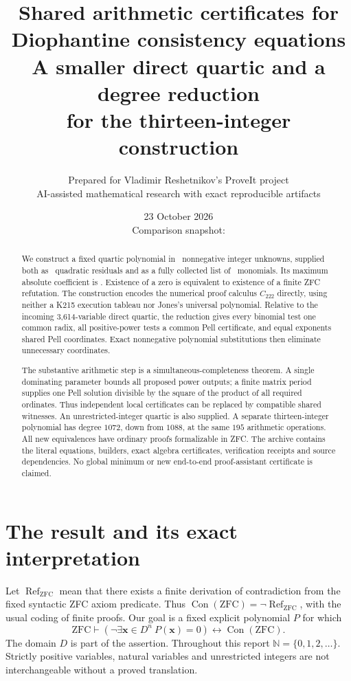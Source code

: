 \documentclass[11pt,letterpaper]{article}
\title{\color{ink}\LARGE Shared arithmetic certificates for\\
 Diophantine consistency equations\\[7pt]
 \large A smaller direct quartic and a degree reduction\\
 for the thirteen-integer construction}
\author{Prepared for Vladimir Reshetnikov's ProveIt project\\
 \small AI-assisted mathematical research with exact reproducible artifacts}
\date{23 October 2026\\[3pt]\small Comparison snapshot: \repoPin}
\newcommand{\N}{\mathbb N}
\newcommand{\Con}{\operatorname{Con}}
\newcommand{\ZFC}{\mathrm{ZFC}}
\begin{document}
\maketitle
\begin{abstract}
We construct a fixed quartic polynomial in \NatVars\ nonnegative integer
unknowns, supplied both as \NatRows\ quadratic residuals and as a fully
collected list of \NatTerms\ monomials. Its maximum absolute coefficient is
\NatHeight. Existence of a zero is equivalent to existence of a finite
ZFC refutation. The construction encodes the numerical proof calculus
$C_{222}$ directly, using neither a K215 execution tableau nor Jones's
universal polynomial. Relative to the incoming 3,614-variable direct
quartic, the reduction gives every binomial test one common radix,
all positive-power tests a common Pell certificate, and equal
exponents shared Pell coordinates. Exact nonnegative polynomial
substitutions then eliminate unnecessary coordinates.

The substantive arithmetic step is a simultaneous-completeness theorem.
A single dominating parameter bounds all proposed power outputs; a
finite matrix period supplies one Pell solution divisible by the square
of the product of all required ordinates. Thus independent local
certificates can be replaced by compatible shared witnesses.
An unrestricted-integer quartic is also supplied. A separate
thirteen-integer polynomial has degree $1072$, down from $1088$, at the
same $195$ arithmetic operations. All new equivalences have ordinary
proofs formalizable in ZFC. The archive contains the literal equations,
builders, exact algebra certificates, verification receipts and source
dependencies. No global minimum or new end-to-end proof-assistant
certificate is claimed.
\end{abstract}
\clearpage
{\small\setlength{\parskip}{0pt}\tableofcontents}
\clearpage

\section{The result and its exact interpretation}
\label{sec:result}

Let $\operatorname{Ref}_{\ZFC}$ mean that there exists a finite derivation
of contradiction from the fixed syntactic ZFC axiom predicate. Thus
$\Con(\ZFC)=\neg\operatorname{Ref}_{\ZFC}$, with the usual coding
of finite proofs. Our goal is a fixed explicit polynomial $P$ for which
\[
 \ZFC\vdash
 \left(\neg\exists\mathbf x\in D^n\ P(\mathbf x)=0\right)
 \longleftrightarrow \Con(\ZFC).
\]
The domain $D$ is part of the assertion. Throughout this report
$\N=\{0,1,2,\ldots\}$. Strictly positive variables, natural variables
and unrestricted integers are not interchangeable without a proved
translation.
\end{document}
